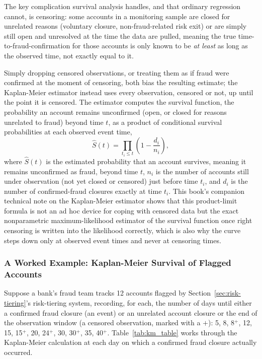 \documentclass[../ai_in_finance]{subfiles}
\begin{document}
The key complication survival analysis handles, and that ordinary regression cannot, is censoring: some accounts in a monitoring sample are closed for unrelated reasons (voluntary closure, non-fraud-related risk exit) or are simply still open and unresolved at the time the data are pulled, meaning the true time-to-fraud-confirmation for those accounts is only known to be \emph{at least} as long as the observed time, not exactly equal to it.

Simply dropping censored observations, or treating them as if fraud were confirmed at the moment of censoring, both bias the resulting estimate; the Kaplan-Meier estimator instead uses every observation, censored or not, up until the point it is censored. The estimator computes the survival function, the probability an account remains unconfirmed (open, or closed for reasons unrelated to fraud) beyond time $t$, as a product of conditional survival probabilities at each observed event time,
\begin{equation*}
\hat S(t) = \prod_{t_i \le t} \left(1 - \frac{d_i}{n_i}\right),
\end{equation*}
where $\hat S(t)$ is the estimated probability that an account survives, meaning it remains unconfirmed as fraud, beyond time $t$, $n_i$ is the number of accounts still under observation (not yet closed or censored) just before time $t_i$, and $d_i$ is the number of confirmed-fraud closures exactly at time $t_i$. This book's companion technical note on the Kaplan-Meier estimator shows that this product-limit formula is not an ad hoc device for coping with censored data but the exact nonparametric maximum-likelihood estimator of the survival function once right censoring is written into the likelihood correctly, which is also why the curve steps down only at observed event times and never at censoring times.

\subsubsection*{A Worked Example: Kaplan-Meier Survival of Flagged Accounts}

Suppose a bank's fraud team tracks 12 accounts flagged by Section~\ref{sec:risk-tiering}'s risk-tiering system, recording, for each, the number of days until either a confirmed fraud closure (an event) or an unrelated account closure or the end of the observation window (a censored observation, marked with a $+$): 5, 8, 8$^+$, 12, 15, 15$^+$, 20, 24$^+$, 30, 30$^+$, 35, 40$^+$. Table~\ref{tab:km_table} works through the Kaplan-Meier calculation at each day on which a confirmed fraud closure actually occurred.
\end{document}
